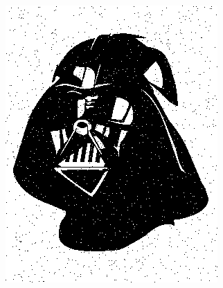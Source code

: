\documentclass[]{article}
\begin{document}
\begin{section}
\begin{figure}
\begin{subfigure}{0.4\textwidth}
                \includegraphics[width=\textwidth]{vraag3_3/uncoded_uncompressed.png}
                \caption{}
                \label{fig:3_3:uncoded_uncompressed}
            \end{subfigure}


\end{figure}
\end{section}
\end{document}
